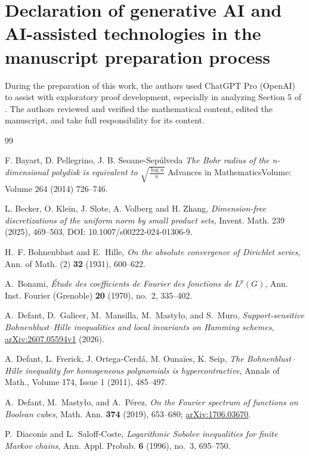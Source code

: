 \documentclass[11pt]{article}
\theoremstyle{definition}
\theoremstyle{remark}
\begin{document}
\section{
Declaration of generative AI and AI-assisted technologies in the manuscript
preparation process}
During the preparation of this work, the authors used ChatGPT Pro (OpenAI) to assist with exploratory
proof development, especially in analyzing Section 5 of \cite{PellegrinoTeixeira}. The authors reviewed and verified the mathematical content, edited the
manuscript, and take full responsibility for its content.
\begin{thebibliography}{99}

F. Bayart, D. Pellegrino, J. B. Seoane-Sep\'ulveda
\emph{The Bohr radius of the n-dimensional polydisk is equivalent to $\sqrt{\frac{\log n}{n}}$}
Advances in MathematicsVolume: Volume 264 (2014) 726--746.

L. Becker, O. Klein, J. Slote, A. Volberg and H. Zhang, 
\emph{Dimension-free discretizations of the uniform
norm by small product sets,}
 Invent. Math. 239 (2025), 469--503, DOI: 10.1007/s00222-024-01306-9.

H.~F. Bohnenblust and E.~Hille,
\emph{On the absolute convergence of Dirichlet series},
Ann. of Math. (2) \textbf{32} (1931), 600--622.

A.~Bonami,
\emph{\'{E}tude des coefficients de Fourier des fonctions de $L^p(G)$},
Ann. Inst. Fourier (Grenoble) \textbf{20} (1970), no.~2, 335--402.

A.~Defant, D.~Galicer, M.~Mansilla, M.~Masty\l o, and S.~Muro,
\emph{Support-sensitive Bohnenblust--Hille inequalities and local invariants
on Hamming schemes},
\href{https://arxiv.org/abs/2607.05594}{arXiv:2607.05594v1} (2026).

A. Defant, L. Frerick, J. Ortega-Cerd\'a, M.  Ouna\"ies, K. Seip,
\emph{The Bohnenblust–Hille inequality for homogeneous polynomials is hypercontractive},
Annals of Math., Volume 174, Issue 1 (2011), 485--497.

A.~Defant, M.~Masty\l o, and A.~P\'erez,
\emph{On the Fourier spectrum of functions on Boolean cubes},
Math. Ann. \textbf{374} (2019), 653--680;
\href{https://arxiv.org/abs/1706.03670}{arXiv:1706.03670}.


P.~Diaconis and L.~Saloff-Coste,
\emph{Logarithmic Sobolev inequalities for finite Markov chains},
Ann. Appl. Probab. \textbf{6} (1996), no.~3, 695--750.


\end{thebibliography}
\end{document}
